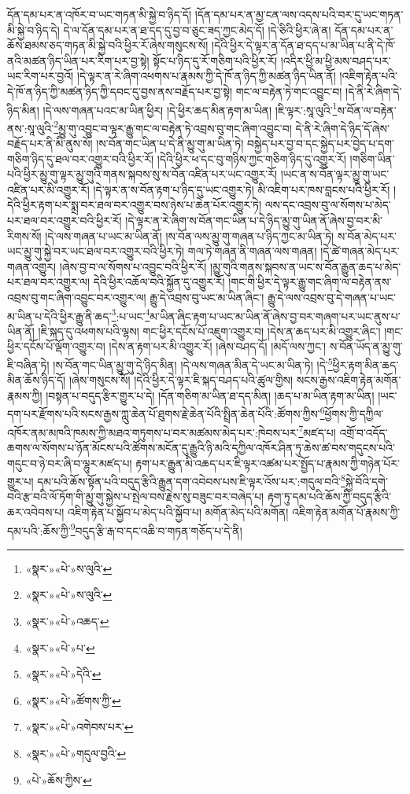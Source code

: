 དོན་དམ་པར་ན་འཁོར་བ་ཡང་གཏན་མི་སྐྱེ་བ་ཉིད་དོ། །དོན་དམ་པར་ན་མྱ་ངན་ལས་འདས་པའི་བར་དུ་ཡང་གཏན་མི་སྐྱེ་བ་ཉིད་དེ། དེ་ལ་དོན་དམ་པར་ན་ཐ་དད་དུ་བྱ་བ་ཅུང་ཟད་ཀྱང་མེད་དོ། །དེ་ཅིའི་ཕྱིར་ཞེ་ན། དོན་དམ་པར་ན་ཆོས་ཐམས་ཅད་གཏན་མི་སྐྱེ་བའི་ཕྱིར་རོ་ཞེས་གསུངས་སོ། །དེའི་ཕྱིར་དེ་ལྟར་ན་དོན་ཐ་དད་པ་མ་ཡིན་པ་ནི་དེ་ཁོ་ནའི་མཚན་ཉིད་ཡིན་པར་རིག་པར་བྱ་སྟེ། སྟོང་པ་ཉིད་དུ་རོ་གཅིག་པའི་ཕྱིར་རོ། །འདིར་ཕྱི་མ་ཕྱི་མས་བཤད་པར་ཡང་རིག་པར་བྱའོ། །དེ་ལྟར་ན་རེ་ཞིག་འཕགས་པ་རྣམས་ཀྱི་དེ་ཁོ་ན་ཉིད་ཀྱི་མཚན་ཉིད་ཡིན་ནོ། །འཇིག་རྟེན་པའི་དེ་ཁོ་ན་ཉིད་ཀྱི་མཚན་ཉིད་ཀྱི་དབང་དུ་བྱས་ནས་བརྗོད་པར་བྱ་སྟེ། གང་ལ་བརྟེན་ཏེ་གང་འབྱུང་བ། །དེ་ནི་རེ་ཞིག་དེ་ཉིད་མིན། །དེ་ལས་གཞན་པའང་མ་ཡིན་ཕྱིར། །དེ་ཕྱིར་ཆད་མིན་རྟག་མ་ཡིན། །ཇི་ལྟར་:སཱ་ལུའི་\footnote{«སྣར་»«པེ་»ས་ལུའི་}ས་བོན་ལ་བརྟེན་ནས་:སཱ་ལུའི་\footnote{«སྣར་»«པེ་»ས་ལུའི་}མྱུ་གུ་འབྱུང་བ་ལྟར་རྒྱུ་གང་ལ་བརྟེན་ཏེ་འབྲས་བུ་གང་ཞིག་འབྱུང་བ། དེ་ནི་རེ་ཞིག་དེ་ཉིད་དོ་ཞེས་བརྗོད་པར་ནི་མི་ནུས་སོ། །ས་བོན་གང་ཡིན་པ་དེ་ནི་མྱུ་གུ་མ་ཡིན་ཏེ། བསྐྱེད་པར་བྱ་བ་དང་སྐྱེད་པར་བྱེད་པ་དག་གཅིག་ཉིད་དུ་ཐལ་བར་འགྱུར་བའི་ཕྱིར་རོ། །དེའི་ཕྱིར་ཕ་དང་བུ་གཉིས་ཀྱང་གཅིག་ཉིད་དུ་འགྱུར་རོ། །གཅིག་ཡིན་པའི་ཕྱིར་མྱུ་གུ་ལྟར་མྱུ་གུའི་གནས་སྐབས་སུ་ས་བོན་འཛིན་པར་ཡང་འགྱུར་རོ། །ཡང་ན་ས་བོན་ལྟར་མྱུ་གུ་ཡང་འཛིན་པར་མི་འགྱུར་རོ། །དེ་ལྟར་ན་ས་བོན་རྟག་པ་ཉིད་དུ་ཡང་འགྱུར་ཏེ། མི་འཇིག་པར་ཁས་བླངས་པའི་ཕྱིར་རོ། །དེའི་ཕྱིར་རྟག་པར་སྨྲ་བར་ཐལ་བར་འགྱུར་བས་ཉེས་པ་ཆེན་པོར་འགྱུར་ཏེ། ལས་དང་འབྲས་བུ་ལ་སོགས་པ་མེད་པར་ཐལ་བར་འགྱུར་བའི་ཕྱིར་རོ། །དེ་ལྟར་ན་རེ་ཞིག་ས་བོན་གང་ཡིན་པ་དེ་ཉིད་མྱུ་གུ་ཡིན་ནོ་ཞེས་བྱ་བར་མི་རིགས་སོ། །དེ་ལས་གཞན་པ་ཡང་མ་ཡིན་ནོ། །ས་བོན་ལས་མྱུ་གུ་གཞན་པ་ཉིད་ཀྱང་མ་ཡིན་ཏེ། ས་བོན་མེད་པར་ཡང་མྱུ་གུ་སྐྱེ་བར་ཡང་ཐལ་བར་འགྱུར་བའི་ཕྱིར་ཏེ། གལ་ཏེ་གཞན་ནི་གཞན་ལས་གཞན། །དེ་ཚེ་གཞན་མེད་པར་གཞན་འགྱུར། །ཞེས་བྱ་བ་ལ་སོགས་པ་འབྱུང་བའི་ཕྱིར་རོ། །མྱུ་གུའི་གནས་སྐབས་ན་ཡང་ས་བོན་རྒྱུན་ཆད་པ་མེད་པར་ཐལ་བར་འགྱུར་ལ། དེའི་ཕྱིར་འཆོལ་བའི་སྐྱོན་དུ་འགྱུར་རོ། །གང་གི་ཕྱིར་དེ་ལྟར་རྒྱུ་གང་ཞིག་ལ་བརྟེན་ནས་འབྲས་བུ་གང་ཞིག་འབྱུང་བར་འགྱུར་ལ། རྒྱུ་དེ་འབྲས་བུ་ཡང་མ་ཡིན་ཞིང་། རྒྱུ་དེ་ལས་འབྲས་བུ་དེ་གཞན་པ་ཡང་མ་ཡིན་པ་དེའི་ཕྱིར་རྒྱུ་ནི་ཆད་\footnote{«སྣར་»«པེ་»འཆད་}:པ་ཡང་\footnote{«སྣར་»«པེ་»པ་}མ་ཡིན་ཞིང་རྟག་པ་ཡང་མ་ཡིན་ནོ་ཞེས་བྱ་བར་གཞག་པར་ཡང་ནུས་པ་ཡིན་ནོ། །ཇི་སྐད་དུ་འཕགས་པའི་ལྷས། གང་ཕྱིར་དངོས་པོ་འཇུག་འགྱུར་བ། །དེས་ན་ཆད་པར་མི་འགྱུར་ཞིང་། །གང་ཕྱིར་དངོས་པོ་ལྡོག་འགྱུར་བ། །དེས་ན་རྟག་པར་མི་འགྱུར་རོ། །ཞེས་བཤད་དོ། །མདོ་ལས་ཀྱང་། ས་བོན་ཡོད་ན་མྱུ་གུ་ཇི་བཞིན་ཏེ། །ས་བོན་གང་ཡིན་མྱུ་གུ་དེ་ཉིད་མིན། །དེ་ལས་གཞན་མིན་དེ་ཡང་མ་ཡིན་ཏེ། །དེ་\footnote{«སྣར་»«པེ་»དེའི་}ཕྱིར་རྟག་མིན་ཆད་མིན་ཆོས་ཉིད་དོ། །ཞེས་གསུངས་སོ། །དེའི་ཕྱིར་དེ་ལྟར་ཇི་སྐད་བཤད་པའི་ཚུལ་གྱིས། སངས་རྒྱས་འཇིག་རྟེན་མགོན་རྣམས་ཀྱི། །བསྟན་པ་བདུད་རྩིར་གྱུར་པ་དེ། །དོན་གཅིག་མ་ཡིན་ཐ་དད་མིན། །ཆད་པ་མ་ཡིན་རྟག་མ་ཡིན། །ཡང་དག་པར་རྫོགས་པའི་སངས་རྒྱས་ཀླུ་ཆེན་པོ་ཐུགས་རྗེ་ཆེན་པོའི་སྤྲིན་ཆེན་པོའི་:ཚོགས་ཀྱིས་\footnote{«སྣར་»«པེ་»ཚོགས་ཀྱི་}ཕྱོགས་ཀྱི་དཀྱིལ་འཁོར་ནམ་མཁའི་ཁམས་ཀྱི་མཐའ་གཏུགས་པ་བར་མཚམས་མེད་པར་:ཁེབས་པར་\footnote{«སྣར་»«པེ་»འགེབས་པར་}མཛད་པ། འགྲོ་བ་འདོད་ཆགས་ལ་སོགས་པ་ཉོན་མོངས་པའི་ཚོགས་མངོན་དུ་རྒྱུའི་ཉི་མའི་དཀྱིལ་འཁོར་ཤིན་ཏུ་ཆེས་ཚ་བས་གདུངས་པའི་གདུང་བ་ཉེ་བར་ཞི་བ་ལྷུར་མཛད་པ། རྟག་པར་རྒྱུན་མི་འཆད་པར་ཇི་ལྟར་འཚམ་པར་སྤྱོད་པ་རྣམས་ཀྱི་གཉེན་པོར་གྱུར་པ། དམ་པའི་ཆོས་སྟོན་པའི་བདུད་རྩིའི་རྒྱུན་དག་འབེབས་པས་ཇི་ལྟར་འོས་པར་:གདུལ་བའི་\footnote{«སྣར་»«པེ་»གདུལ་བྱའི་}སྐྱེ་བོའི་དགེ་བའི་རྩ་བའི་ལོ་ཏོག་གི་མྱུ་གུ་སྐྱེས་པ་སྤེལ་བས་རྗེས་སུ་བཟུང་བར་བཞེད་པ། རྟག་ཏུ་དམ་པའི་ཆོས་ཀྱི་བདུད་རྩིའི་ཆར་འབེབས་པ། འཇིག་རྟེན་པ་སྐྱོབ་པ་མེད་པའི་སྐྱོབ་པ། མགོན་མེད་པའི་མགོན། འཇིག་རྟེན་མགོན་པོ་རྣམས་ཀྱི་དམ་པའི་:ཆོས་ཀྱི་\footnote{«པེ་»ཆོས་ཀྱིས་}བདུད་རྩི་རྒ་བ་དང་འཆི་བ་གཏན་གཅོད་པ་དེ་ནི། 